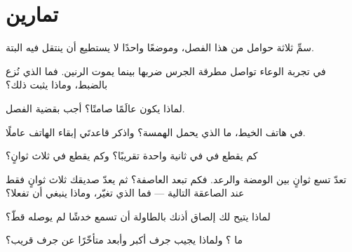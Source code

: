\section{تمارين}

\begin{exercise}[$\star$]\label{exo:g4:how-sound-travels:1}
سمِّ ثلاثة حوامل  من هذا الفصل، وموضعًا واحدًا لا يستطيع
 أن ينتقل فيه البتة.
\end{exercise}

\begin{exercise}[$\star$]\label{exo:g4:how-sound-travels:2}
في تجربة الوعاء تواصل مطرقة الجرس ضربها بينما يموت الرنين. فما
الذي نُزع بالضبط، وماذا يثبت ذلك؟
\end{exercise}

\begin{exercise}[$\star$]\label{exo:g4:how-sound-travels:3}
لماذا يكون  عالَمًا صامتًا؟ أجب بقضية الفصل.
\end{exercise}

\begin{exercise}[$\star$]\label{exo:g4:how-sound-travels:4}
في هاتف الخيط، ما الذي يحمل الهمسة؟ واذكر قاعدتَي إبقاء الهاتف
عاملًا.
\end{exercise}

\begin{exercise}[$\star$]\label{exo:g4:how-sound-travels:5}
كم يقطع  في  في ثانية واحدة تقريبًا؟ وكم يقطع في
ثلاث ثوانٍ؟
\end{exercise}

\begin{exercise}[$\star$]\label{exo:g4:how-sound-travels:6}
تعدّ تسع ثوانٍ بين الومضة والرعد. فكم تبعد العاصفة؟ ثم يعدّ
صديقك ثلاث ثوانٍ فقط عند الصاعقة التالية --- فما الذي تغيّر،
وماذا ينبغي أن تفعلا؟
\end{exercise}

\begin{exercise}[$\star$]\label{exo:g4:how-sound-travels:7}
لماذا يتيح لك إلصاق أذنك بالطاولة أن تسمع خدشًا لم يوصله 
قطّ؟
\end{exercise}

\begin{exercise}[$\star$]\label{exo:g4:how-sound-travels:8}
ما ؟ ولماذا يجيب جرف أكبر وأبعد متأخّرًا عن جرف قريب؟
\end{exercise}

